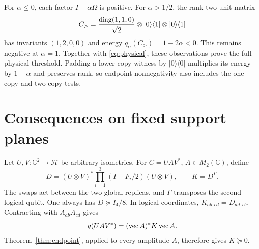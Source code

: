 \documentclass[11pt,a4paper]{article}
\theoremstyle{definition}\newtheorem{definition}[theorem]{Definition}
\theoremstyle{remark}\newtheorem{remark}[theorem]{Remark}
\newcommand{\C}{\mathbb C}\newcommand{\R}{\mathbb R}
\newcommand{\HH}{\mathcal H}\newcommand{\LL}{\mathcal L}
\newcommand{\ket}[1]{|#1\rangle}\newcommand{\bra}[1]{\langle#1|}
\numberwithin{equation}{section}
\begin{document}
For $\alpha\le0$, each factor $I-\alpha\Omega$ is positive.
For $\alpha>1/2$, the rank-two unit matrix
\begin{equation}
C_>=\frac{\diag(1,1,0)}{\sqrt2}
       \otimes\ket0\bra1\otimes\ket0\bra1
\label{eq:above}
\end{equation}
has invariants $(1,2,0,0)$ and energy $q_\alpha(C_>)=1-2\alpha<0$.
This remains negative at $\alpha=1$.
Together with \eqref{eq:physical}, these observations prove the full
physical threshold. Padding a lower-copy witness by
$\ket0\bra0$ multiplies its energy by $1-\alpha$ and preserves rank,
so endpoint nonnegativity also includes the one-copy and two-copy tests.

\section{Consequences on fixed support planes}\label{sec:pair}
Let $U,V:\C^2\to\HH$ be arbitrary isometries.
For $C=UAV^*$, $A\in M_2(\C)$, define
\begin{equation}
D=(U\otimes V)^*\prod_{i=1}^3(I-F_i/2)(U\otimes V),
\qquad K=D^\Gamma.
\label{eq:paired}
\end{equation}
The swaps act between the two global replicas, and $\Gamma$
transposes the second logical qubit.
One always has $D\succeq I_4/8$.
In logical coordinates, $K_{ab,cd}=D_{ad,cb}$.
Contracting with $\overline{A_{ab}}A_{cd}$ gives
\begin{equation}
q(UAV^*)=(\operatorname{vec} A)^*K\operatorname{vec} A.
\label{eq:pairenergy}
\end{equation}
Theorem~\ref{thm:endpoint}, applied to every amplitude $A$, therefore
gives $K\succeq0$.
\end{document}
